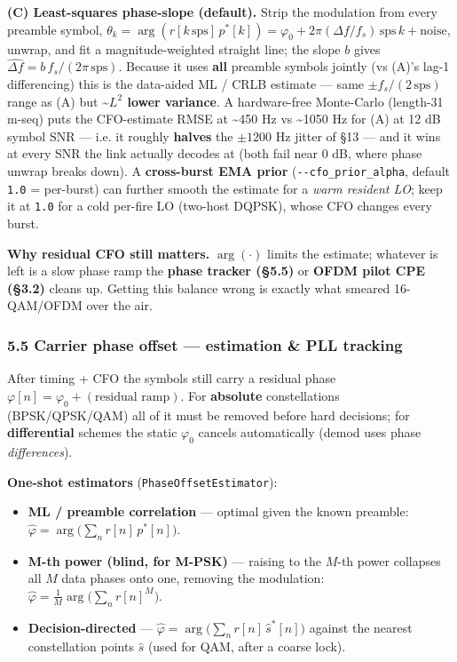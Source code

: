 \documentclass[
  10pt,
]{article}
\providecommand{\tightlist}{%
  \setlength{\itemsep}{0pt}\setlength{\parskip}{0pt}}
\begin{document}
\textbf{(C) Least-squares phase-slope (default).} Strip the modulation
from every preamble symbol,
\(\theta_k = \arg(r[k\,\text{sps}]\,p^{*}[k]) = \varphi_0 + 2\pi(\Delta f/f_s)\,\text{sps}\,k + \text{noise}\),
unwrap, and fit a magnitude-weighted straight line; the slope \(b\)
gives \(\widehat{\Delta f} = b\,f_s/(2\pi\,\text{sps})\). Because it
uses \textbf{all} preamble symbols jointly (vs (A)'s lag-1 differencing)
this is the data-aided ML / CRLB estimate --- same
\(\pm f_s/(2\,\text{sps})\) range as (A) but
\textbf{\textasciitilde{}\(L^2\) lower variance}. A hardware-free
Monte-Carlo (length-31 m-seq) puts the CFO-estimate RMSE at
\textasciitilde450 Hz vs \textasciitilde1050 Hz for (A) at 12 dB symbol
SNR --- i.e. it roughly \textbf{halves} the \(\pm1200\) Hz jitter of §13
--- and it wins at every SNR the link actually decodes at (both fail
near 0 dB, where phase unwrap breaks down). A \textbf{cross-burst EMA
prior} (\texttt{-\/-cfo\_prior\_alpha}, default \texttt{1.0} =
per-burst) can further smooth the estimate for a \emph{warm resident
LO}; keep it at \texttt{1.0} for a cold per-fire LO (two-host DQPSK),
whose CFO changes every burst.

\textbf{Why residual CFO still matters.} \(\arg(\cdot)\) limits the
estimate; whatever is left is a slow phase ramp the \textbf{phase
tracker (§5.5)} or \textbf{OFDM pilot CPE (§3.2)} cleans up. Getting
this balance wrong is exactly what smeared 16-QAM/OFDM over the air.

\hypertarget{55-carrier-phase-offset--estimation--pll-tracking}{%
\subsubsection{5.5 Carrier phase offset --- estimation \& PLL
tracking}\label{55-carrier-phase-offset--estimation--pll-tracking}}

After timing + CFO the symbols still carry a residual phase
\(\varphi[n] = \varphi_0 + (\text{residual ramp})\). For
\textbf{absolute} constellations (BPSK/QPSK/QAM) all of it must be
removed before hard decisions; for \textbf{differential} schemes the
static \(\varphi_0\) cancels automatically (demod uses phase
\emph{differences}).

\textbf{One-shot estimators} (\texttt{PhaseOffsetEstimator}):

\begin{itemize}
\tightlist
\item
  \textbf{ML / preamble correlation} --- optimal given the known
  preamble: \(\hat{\varphi} = \arg\!\big(\sum_n r[n]\,p^{*}[n]\big)\).
\item
  \textbf{M-th power (blind, for M-PSK)} --- raising to the \(M\)-th
  power collapses all \(M\) data phases onto one, removing the
  modulation:
  \(\hat{\varphi} = \tfrac{1}{M}\arg\!\big(\sum_n r[n]^{M}\big)\).
\item
  \textbf{Decision-directed} ---
  \(\hat{\varphi} = \arg\!\big(\sum_n r[n]\,\hat{s}^{*}[n]\big)\)
  against the nearest constellation points \(\hat{s}\) (used for QAM,
  after a coarse lock).
\end{itemize}
\end{document}

